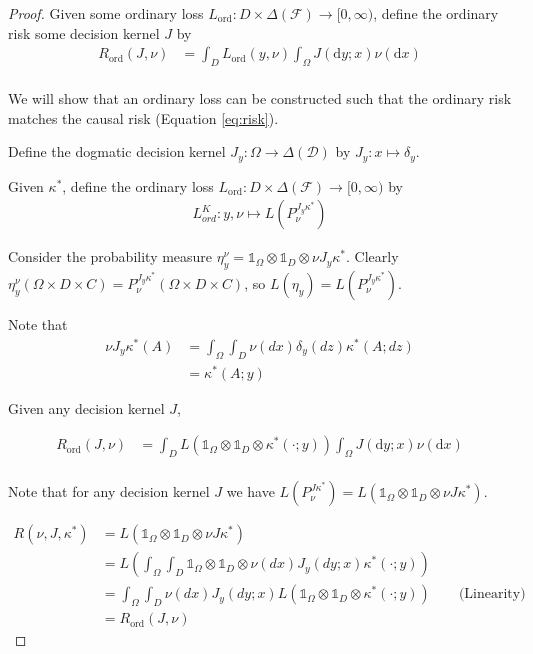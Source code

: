 \begin{proof}
Given some ordinary loss $L_{\text{ord}}:D\times \Delta(\mathcal{F})\to [0,\infty)$, define the ordinary risk some decision kernel $J$ by \cite{wald1950statistical}
\begin{align}
    R_{\text{ord}}(J,\nu) &= \int_D L_{\text{ord}}(y,\nu) \int_\Omega J(\mathrm{d}y;x) \nu(\mathrm{d}x)\\
\end{align}

We will show that an ordinary loss can be constructed such that the ordinary risk matches the causal risk (Equation \ref{eq:risk}).

Define the dogmatic decision kernel $J_y:\Omega\to \Delta(\mathcal{D})$ by $J_y:x \mapsto \delta_y$.

Given $\kappa^*$, define the ordinary loss $L_{\text{ord}}:D\times \Delta(\mathcal{F})\to [0,\infty)$ by 
\begin{align}
    L^K_{ord}:y,\nu \mapsto L(P^{J_y \kappa^*}_\nu)
\end{align}

Consider the probability measure $\eta^\nu_y=\mathds{1}_{\Omega}\otimes \mathds{1}_D\otimes \nu J_y \kappa^*$. Clearly $\eta^\nu_y(\Omega\times D\times C) = P^{J_y \kappa^*}_\nu(\Omega\times D\times C)$, so $L(\eta_y) = L(P^{J_y \kappa^*}_\nu)$.

Note that
\begin{align}
    \nu J_y \kappa^*(A) &= \int_\Omega \int_D \nu(dx) \delta_y(dz) \kappa^*(A;dz)\\
    &= \kappa^*(A;y)
\end{align}

Given any decision kernel $J$,

\begin{align}
    R_{\text{ord}}(J,\nu) &= \int_D L(\mathds{1}_{\Omega}\otimes \mathds{1}_D\otimes \kappa^*(\cdot;y)) \int_\Omega J(\mathrm{d}y;x) \nu(\mathrm{d}x)\\
\end{align}

Note that for any decision kernel $J$ we have $L(P^{J\kappa^*}_\nu) = L(\mathds{1}_\Omega\otimes\mathds{1}_D\otimes \nu J \kappa^*)$.

\begin{align}
    R(\nu,J,\kappa^*) &= L(\mathds{1}_\Omega\otimes\mathds{1}_D\otimes \nu J \kappa^*)\\
     &= L\left(\int_\Omega \int_D \mathds{1}_\Omega\otimes\mathds{1}_D\otimes \nu(dx) J_y(dy;x) \kappa^*(\cdot;y)\right)\\
    &= \int_\Omega \int_D \nu(dx) J_y(dy;x) L(\mathds{1}_\Omega\otimes\mathds{1}_D\otimes  \kappa^*(\cdot;y))\qquad\text{(Linearity)}\\
    &= R_{\text{ord}}(J,\nu)
\end{align}
\end{proof}

